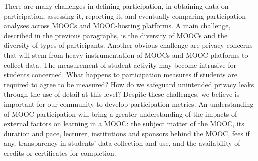  There are many challenges in defining participation, in
obtaining data on participation, assessing it, reporting it, and
eventually comparing participation analyses across MOOCs and
MOOC-hosting platforms. A main challenge, described in the previous
paragraphs, is the diversity of MOOCs and the diversity of types of
participants. Another obvious challenge are privacy concerns that will
stem from heavy instrumentation of MOOCs and MOOC platforms to collect
data. The measurement of student activity may become intrusive for
students concerned. What happens to participation measures if students
are required to agree to be measured? How do we safeguard unintended
privacy leaks through the use of detail at this level?  Despite these
challenges, we believe is important for our community to develop
participation metrics. An understanding of MOOC participation will bring
a greater understanding of the impacts of external factors on learning
in a MOOC: the subject matter of the MOOC, its duration and pace,
lecturer, institutions and sponsors behind the MOOC, fees if any,
transparency in students' data collection and use, and the availability
of credits or certificates for completion.

